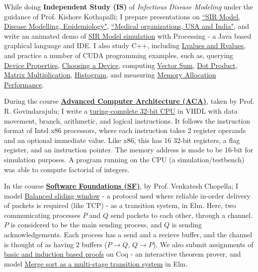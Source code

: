 While doing \textbf{Independent Study (IS)} of \textit{Infectious Disease Modeling} under the guidance of Prof. Kishore Kothapalli; I prepare presentations on \href{https://gist.github.com/wolfram77/45a01f935b6a72800af16ddbe0af34e3}{``SIR Model, Disease Modelling, Epidemiology"}, \href{https://gist.github.com/wolfram77/a7a90549c3c36667860d2832c093a72b}{``Medical organizations, USA and India"}, and write an animated demo of \href{https://github.com/orgs/processingf/sir_model}{SIR Model simulation} with Processing - a Java based graphical language and IDE. I also study C++, including \href{https://gist.github.com/wolfram77/e1e304d93e2543ebb616588d00cba795}{Lvalues and Rvalues}, and practice a number of CUDA programming examples, such as, querying \href{https://github.com/cudaf/device-properties}{Device Properties}, \href{https://github.com/cudaf/choose-device}{Choosing a Device}, computing \href{https://github.com/cudaf/vector-sum}{Vector Sum}, \href{https://github.com/cudaf/dot-product}{Dot Product}, \href{https://github.com/cudaf/matrix-multiplication}{Matrix Multiplication}, \href{https://github.com/cudaf/histogram}{Histogram}, and measuring \href{https://github.com/cudaf/malloc-test}{Memory Allocation Performance}.

During the course \textbf{\href{https://github.com/iiithf/advanced-computer-architecture}{Advanced Computer Architecture (ACA)}}, taken by Prof. R. Govindarajulu; I write a \href{https://github.com/vhdlf/cpu_basic}{turing-complete 32-bit CPU} in VHDL with data movement, branch, arithmetic, and logical instructions. It follows the instruction format of Intel x86 processors, where each instruction takes 2 register operands and an optional immediate value. Like x86, this has 16 32-bit registers, a flag register, and an instruction pointer. The memory address is made to be 16-bit for simulation purposes. A program running on the CPU (a simulation/testbench) was able to compute factorial of integers.

In the course \textbf{\href{https://github.com/iiithf/software-foundations}{Software Foundations (SF)}}, by Prof. Venkatesh Chopella; I model \href{https://github.com/htmlf/balanced-sliding-window}{Balanced sliding window} - a protocol used where reliable in-order delivery of packets is required (like TCP) - as a transition system, in Elm. Here, two communicating processes $P$ and $Q$ send packets to each other, through a channel. $P$ is considered to be the main sending process, and $Q$ is sending acknowledgements. Each process has a send and a recieve buffer, and the channel is thought of as having $2$ buffers ($P \rightarrow Q$, $Q \rightarrow P$). We also submit assignments of \href{https://github.com/iiithf/software-foundations/blob/main/Assignments/Coq}{basic and induction based proofs} on Coq - an interactive theorem prover, and model \href{https://github.com/htmlf/merge-sort}{Merge sort as a multi-stage transition system} in Elm.

